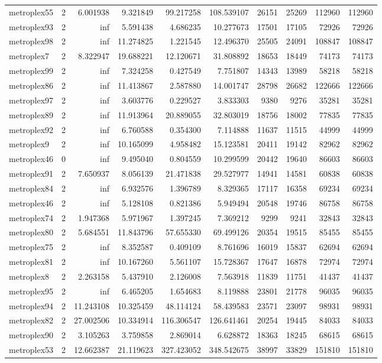 \begin{longtable}{|l|r|r|r|r|r|r|r|r|r|}
metroplex55 & 2 & 6.001938 & 9.321849 & 99.217258 & 108.539107 & 26151 & 25269 & 112960 & 112960 \\
metroplex93 & 2 & inf & 5.591438 & 4.686235 & 10.277673 & 17501 & 17105 & 72926 & 72926 \\
metroplex98 & 2 & inf & 11.274825 & 1.221545 & 12.496370 & 25505 & 24091 & 108847 & 108847 \\
metroplex7 & 2 & 8.322947 & 19.688221 & 12.120671 & 31.808892 & 18653 & 18449 & 74173 & 74173 \\
metroplex99 & 2 & inf & 7.324258 & 0.427549 & 7.751807 & 14343 & 13989 & 58218 & 58218 \\
metroplex86 & 2 & inf & 11.413867 & 2.587880 & 14.001747 & 28798 & 26682 & 122666 & 122666 \\
metroplex97 & 2 & inf & 3.603776 & 0.229527 & 3.833303 & 9380 & 9276 & 35281 & 35281 \\
metroplex89 & 2 & inf & 11.913964 & 20.889055 & 32.803019 & 18756 & 18002 & 77835 & 77835 \\
metroplex92 & 2 & inf & 6.760588 & 0.354300 & 7.114888 & 11637 & 11515 & 44999 & 44999 \\
metroplex9 & 2 & inf & 10.165099 & 4.958482 & 15.123581 & 20411 & 19142 & 82962 & 82962 \\
metroplex46 & 0 & inf & 9.495040 & 0.804559 & 10.299599 & 20442 & 19640 & 86603 & 86603 \\
metroplex91 & 2 & 7.650937 & 8.056139 & 21.471838 & 29.527977 & 14941 & 14581 & 60838 & 60838 \\
metroplex84 & 2 & inf & 6.932576 & 1.396789 & 8.329365 & 17117 & 16358 & 69234 & 69234 \\
metroplex46 & 2 & inf & 5.128108 & 0.821386 & 5.949494 & 20548 & 19746 & 86758 & 86758 \\
metroplex74 & 2 & 1.947368 & 5.971967 & 1.397245 & 7.369212 & 9299 & 9241 & 32843 & 32843 \\
metroplex80 & 2 & 5.684551 & 11.843796 & 57.655330 & 69.499126 & 20354 & 19515 & 85455 & 85455 \\
metroplex75 & 2 & inf & 8.352587 & 0.409109 & 8.761696 & 16019 & 15837 & 62694 & 62694 \\
metroplex81 & 2 & inf & 10.167260 & 5.561107 & 15.728367 & 17647 & 16878 & 72974 & 72974 \\
metroplex8 & 2 & 2.263158 & 5.437910 & 2.126008 & 7.563918 & 11839 & 11751 & 41437 & 41437 \\
metroplex95 & 2 & inf & 6.465205 & 1.654683 & 8.119888 & 23801 & 21778 & 96035 & 96035 \\
metroplex94 & 2 & 11.243108 & 10.325459 & 48.114124 & 58.439583 & 23571 & 23097 & 98931 & 98931 \\
metroplex82 & 2 & 27.002506 & 10.334914 & 116.306547 & 126.641461 & 20254 & 19445 & 84033 & 84033 \\
metroplex90 & 2 & 3.105263 & 3.759858 & 2.869014 & 6.628872 & 18363 & 18245 & 68615 & 68615 \\
metroplex53 & 2 & 12.662387 & 21.119623 & 327.423052 & 348.542675 & 38997 & 33829 & 151810 & 151810 \\
\end{longtable}
